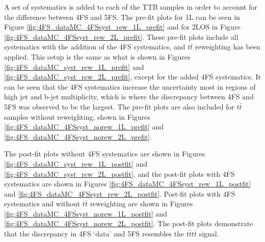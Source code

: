 


A set of systematics is added to each of the TTB samples in order to account for the difference between 4FS and 5FS. The pre-fit plots for 1L can be seen in Figure \ref{fig:4FS_dataMC_4FSsyst_rew_1L_prefit} and for 2LOS in Figure \ref{fig:4FS_dataMC_4FSsyst_rew_2L_prefit}. These pre-fit plots include all systematics with the addition of the 4FS systematics, and $t\bar{t}$ reweighting has been applied. This setup is the same as what is shown in Figures \ref{fig:4FS_dataMC_syst_rew_1L_prefit} and \ref{fig:4FS_dataMC_syst_rew_2L_prefit}, except for the added 4FS systematics. It can be seen that the 4FS systematics increase the uncertainty most in regions of high jet and b-jet multiplicity, which is where the discrepancy between 4FS and 5FS was observed to be the largest. The pre-fit plots are also included for $t\bar{t}$ samples without reweighting, shown in Figures \ref{fig:4FS_dataMC_4FSsyst_norew_1L_prefit} and \ref{fig:4FS_dataMC_4FSsyst_norew_2L_prefit}. 

The post-fit plots without 4FS systematics are shown in Figures \ref{fig:4FS_dataMC_syst_rew_1L_postfit} and \ref{fig:4FS_dataMC_syst_rew_2L_postfit}, and the post-fit plots with 4FS systematics are shown in Figures \ref{fig:4FS_dataMC_4FSsyst_rew_1L_postfit} and \ref{fig:4FS_dataMC_4FSsyst_rew_2L_postfit}. Post-fit plots with 4FS systematics and without $t\bar{t}$ reweighting are shown in Figures \ref{fig:4FS_dataMC_4FSsyst_norew_1L_postfit} and \ref{fig:4FS_dataMC_4FSsyst_norew_2L_postfit}. The post-fit plots demonstrate that the discrepancy in 4FS `data' and 5FS resembles the $t\bar{t}t\bar{t}$ signal. 

